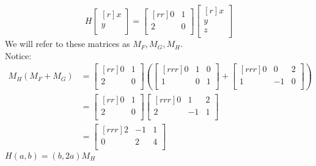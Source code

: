 \documentclass{report}
\begin{document}
\[ H\begin{bmatrix}[r]x\\y\\\end{bmatrix}=\begin{bmatrix}[rr]0&1\\2&0\\\end{bmatrix}\begin{bmatrix}[r]x\\y\\z\\\end{bmatrix}\]
We will refer to these matrices as $M_F, M_G, M_H$.\\
Notice:
\begin{align*}
M_H(M_F+M_G) &= \begin{bmatrix}[rr]0&1\\2&0\\\end{bmatrix}\left(\begin{bmatrix}[rrr]0&1&0\\1&0&1\\\end{bmatrix}+\begin{bmatrix}[rrr]0&0&2\\1&-1&0\\\end{bmatrix}\right )\\
&= \begin{bmatrix}[rr]0&1\\2&0\\\end{bmatrix}\begin{bmatrix}[rrr]0&1&2\\2&-1&1\\\end{bmatrix}\\
&=\begin{bmatrix}[rrr]2&-1&1\\0&2&4\\\end{bmatrix}
\end{align*}
$H(a,b)=(b,2a)M_H$
\end{document}
